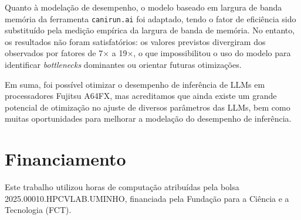 \documentclass[11pt, a4paper]{article}
\begin{document}
Quanto à modelação de desempenho, o modelo baseado em largura de banda memória da ferramenta
\texttt{canirun.ai} foi adaptado, tendo o fator de eficiência sido substituído pela medição empírica
da largura de banda de memória. No entanto, os resultados não foram satisfatórios: os valores
previstos divergiram dos observados por fatores de 7$\times$ a 19$\times$, o que impossibilitou o
uso do modelo para identificar \emph{bottlenecks} dominantes ou orientar futuras otimizações.

Em suma, foi possível otimizar o desempenho de inferência de LLMs em processadores Fujitsu A64FX,
mas acreditamos que ainda existe um grande potencial de otimização no ajuste de diversos parâmetros
das LLMs, bem como muitas oportunidades para melhorar a modelação do desempenho de inferência.

\section*{Financiamento} %

Este trabalho utilizou horas de computação atribuídas pela bolsa 2025.00010.HPCVLAB.UMINHO,
financiada pela Fundação para a Ciência e a Tecnologia (FCT).
\end{document}
